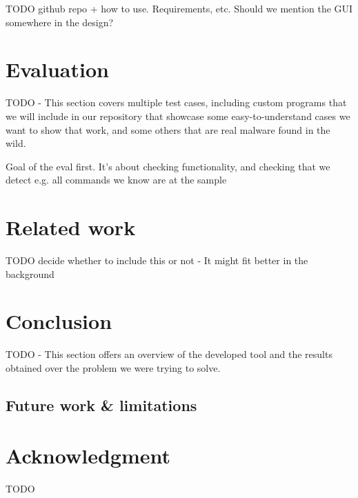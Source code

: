 \documentclass[conference]{IEEEtran}
\begin{document}
TODO github repo + how to use. Requirements, etc. Should we mention the GUI
somewhere in the design?


\section{Evaluation}
TODO - This section covers multiple test cases, including custom programs that
we will include in our repository that showcase some easy-to-understand cases
we want to show that work, and some others that are real malware found in the
wild.

Goal of the eval first. It's about checking functionality, and checking that we
detect e.g. all commands we know are at the sample

\section{Related work}
TODO decide whether to include this or not - It might fit better in the
background

\section{Conclusion}
TODO - This section offers an overview of the developed tool and the results
obtained over the problem we were trying to solve.

\subsection{Future work \& limitations}

\section*{Acknowledgment}
TODO
\end{document}
